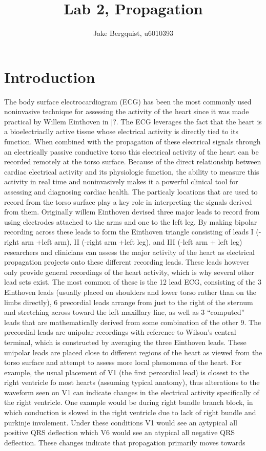 \documentclass[12pt]{article}
\begin{document}
\title{Lab 2, Propagation}
\author{Jake Bergquist, u6010393}
\maketitle
\tableofcontents
\newpage

\section{Introduction}
The body surface electrocardiogram (ECG) has been the most commonly used noninvasive technique for assessing the activity of the heart since it was made practical by Willem Einthoven in |?. The ECG leverages the fact that the heart is a bioelectriaclly active tissue whose electrical activity is directly tied to its function. When combined with the propagation of these electrical signals through an electrically passive conductive torso this electrical activity of the heart can be recorded remotely at the torso surface. Because of the direct relationship between cardiac electrical activity and its physiologic function, the ability to measure this activity in real time and noninvasively makes it a powerful clinical tool for assessing and diagnosing cardiac health. The particaly locations that are used to record from the torso surface play a key role in interpreting the signals derived from them. Originally willem Einthoven devised three major leads to record from using electrodes attached to the arms and one to the left leg. By making bipolar recording across these leads to form the Einthoven triangle consisting of leads I (-right arm +left arm), II (-right arm +left leg), and III (-left arm + left leg) researchers and clinicians can assess the major activity of the heart as electrical propagation projects onto these different recording leads. These leads however only provide general recordings of the heart activity, which is why several other lead sets exist. The most common of these is the 12 lead ECG, consisting of the 3 Einthoven leads (usually placed on shoulders and lower torso rather than on the limbs directly), 6 precordial leads arrange from just to the right of the sternum and stretching across toward the left maxillary line, as well as 3 ``computed'' leads that are mathematically derived from some combination of the other 9. The precordial leads are unipolar recordings with reference to Wilson's central terminal, which is constructed by averaging the three Einthoven leads. These unipolar leads are placed close to different regions of the heart as viewed from the torso surface and attempt to assess more local phenomena of the heart. For example, the usual placement of V1 (the first percordial lead) is closest to the right ventricle fo most hearts (assuming typical anatomy), thus alterations to the waveform seen on V1 can indicate changes in the electrical activity specifically of the right ventricle. One example would be during right bundle branch block, in which conduction is slowed in the right ventricle due to lack of right bundle and purkinje involement. Under these conditions V1 would see an aytypical all positive QRS deflection which V6 would see an atypical all negative QRS deflection. These changes indicate that propagation primarily moves towards 
\end{document}
